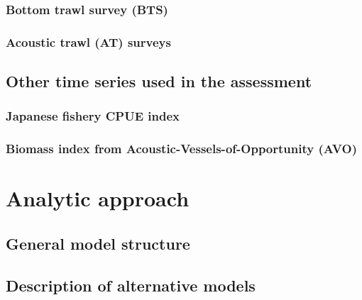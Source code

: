 \documentclass[11pt,]{article}
\begin{document}
\hypertarget{bottom-trawl-survey-bts}{%
\subsubsection{Bottom trawl survey
(BTS)}\label{bottom-trawl-survey-bts}}

\hypertarget{acoustic-trawl-at-surveys}{%
\subsubsection{Acoustic trawl (AT)
surveys}\label{acoustic-trawl-at-surveys}}

\hypertarget{other-time-series-used-in-the-assessment}{%
\subsection{Other time series used in the
assessment}\label{other-time-series-used-in-the-assessment}}

\hypertarget{japanese-fishery-cpue-index}{%
\subsubsection{Japanese fishery CPUE
index}\label{japanese-fishery-cpue-index}}

\hypertarget{biomass-index-from-acoustic-vessels-of-opportunity-avo}{%
\subsubsection{Biomass index from Acoustic-Vessels-of-Opportunity
(AVO)}\label{biomass-index-from-acoustic-vessels-of-opportunity-avo}}

\hypertarget{analytic-approach}{%
\section{Analytic approach}\label{analytic-approach}}

\hypertarget{general-model-structure}{%
\subsection{General model structure}\label{general-model-structure}}

\hypertarget{description-of-alternative-models}{%
\subsection{Description of alternative
models}\label{description-of-alternative-models}}
\end{document}
